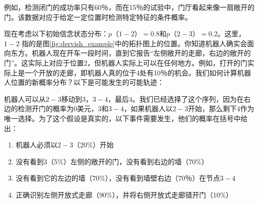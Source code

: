 

例如，检测闭门的成功率只有60％，而在15％的试验中，门厅看起来像一扇敞开的门。该数据对应于给定一定位置时检测特定特征的条件概率。

现在考虑以下初始信念状态分布：$p（1-2）=0.8$和$p（2-3）=0.2$。这里，$1-2$ 指的是图\ref{fig:dervish_example}中的拓扑图上的位置。你知道机器人确实会面向东方。机器人现在开车一段时间，直到它报告“左侧敞开的走廊，右边的敞开的门”。这实际上对应于位置2，但机器人实际上可以在任何地方。例如，打开的门实际上是一个开放的走廊，即机器人真的位于4处有10％的机会。我们如何计算机器人位置的新概率分布？以下是可能发生的可能轨迹：

机器人可以从$2-3$移动到$3$，$3-4$，最后$4$。我们已经选择了这个序列，因为在右边的检测开门的概率为0美元，$3$和$3-4$，如果机器人以$2-3$开始，那么剩下$4$作为唯一选择。为了这个假设是真实的，以下事件需要发生，他们的概率在括号中给出：

\begin{enumerate}

\item 机器人必须以$2-3$（20\%）开始
\item 没有看到$3$（5\%）左侧的敞开的门，没有看到右边的墙（70\%）
\item 没有看到它的左边的墙（70\%），没有看到墙壁右边（70％）在节点$3-4$
\item 正确识别左侧开放式走廊（90\%），并将右侧开放式走廊错开门（10\%）
\end{enumerate}


